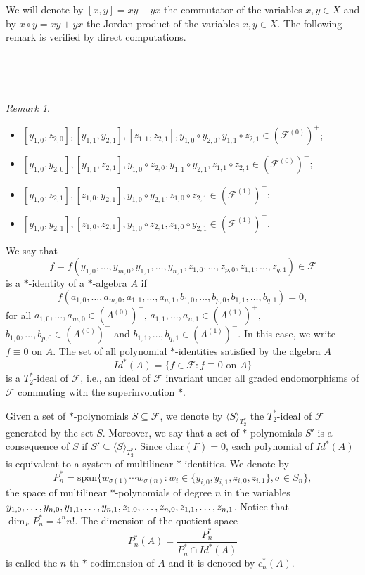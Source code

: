 \documentclass[11pt]{amsart}
\theoremstyle{definition}
\theoremstyle{remark}
\newtheorem{remark}[theorem]{Remark}
\begin{document}
	We will denote by $[x,y]=xy-yx$ the commutator of the variables $x,y\in X$ and by $x\circ y=xy+yx$ the Jordan product of the variables $x,y\in X$. The following remark is verified by direct computations.

\
    
    \

	\begin{remark}\label{consequences}
		\
		
		\begin{itemize}
			\item[1.] $[y_{1,0},z_{2,0}], [y_{1,1},y_{2,1}],[z_{1,1},z_{2,1}],y_{1,0}\circ y_{2,0},y_{1,1}\circ z_{2,1}\in (\mathcal{F}^{(0)})^+$;
			\item[2.] $[y_{1,0},y_{2,0}], [y_{1,1},z_{2,1}], y_{1,0}\circ z_{2,0}, y_{1,1}\circ y_{2,1},z_{1,1}\circ z_{2,1}\in (\mathcal{F}^{(0)})^-$;
			\item[3.] $[y_{1,0},z_{2,1}], [z_{1,0},y_{2,1}],y_{1,0}\circ y_{2,1}, z_{1,0}\circ z_{2,1}\in (\mathcal{F}^{(1)})^+$;
			\item[4.] $[y_{1,0},y_{2,1}], [z_{1,0},z_{2,1}],y_{1,0}\circ z_{2,1}, z_{1,0}\circ y_{2,1}\in (\mathcal{F}^{(1)})^-$.
		\end{itemize}
	\end{remark}
	
	We say that $$f = f(y_{1,0},  \ldots , y_{m,0}, y_{1,1},  \ldots, y_{n,1}, z_{1,0}, \ldots, z_{p,0}, z_{1,1},  \ldots, z_{q,1}) \in \mathcal{F}$$
	is a $*$-identity of a $*$-algebra $A$ if $$f(a_{1,0}, \ldots, a_{m,0},a_{1,1}, \ldots , a_{n,1}, b_{1,0}, \ldots , b_{p,0}, b_{1,1}, \ldots , b_{q,1}) = 0,$$ 
	for all $a_{1,0}, \ldots, a_{m,0} \in (A^{(0)})^{+}$, $a_{1,1}, \ldots, a_{n,1} \in (A^{(1)})^{+}$, $b_{1,0}, \ldots, b_{p,0} \in (A^{(0)})^{-}$ and $b_{1,1}, \ldots , b_{q,1} \in (A^{(1)})^{-}$. In this case, we write $f\equiv 0$ on $A$. The set of all polynomial $*$-identities satisfied by the algebra $A$ 
	$$
	Id^*(A) = \{f \in \mathcal{F}: f \equiv 0 \mbox{ on } A \}
	$$ 
	is a $T^{*}_{2}$-ideal of $\mathcal{F}$, i.e., an ideal of $\mathcal{F}$ invariant under all graded endomorphisms of $\mathcal{F}$ commuting with the superinvolution $*$.
	
	Given a set of $*$-polynomials $S \subseteq \mathcal{F}$, we denote by $\langle S \rangle_{T_2^*}$ the $T_2^*$-ideal of $\mathcal{F}$ generated by the set $S$. Moreover, we say that a set of $*$-polynomials $S'$ is a consequence of $S$ if $S' \subseteq \langle S \rangle_{T_2^*}$. Since char$(F) =0$, each polynomial of $Id^*(A)$ is
	equivalent to a system of multilinear $*$-identities. We denote by
	$$
	P_{n}^{*} = \textrm{span}\{w_{\sigma(1)} \cdots w_{\sigma(n)}: w_{i} \in \{y_{i,0},y_{i,1},z_{i,0},z_{i,1}\}, \sigma \in S_{n}\},
	$$ 
	the space of multilinear $*$-polynomials of degree $n$ in the variables $y_{1,0},  \ldots , y_{n,0}, \\ y_{1,1}, \ldots, y_{n,1}, z_{1,0}, \ldots, z_{n,0}, z_{1,1},  \ldots, z_{n,1}$. Notice that $\dim_FP_n^*=4^nn!$. The dimension of the quotient space
	$$P_n^{*}(A)=\displaystyle \frac{P_n^{*}}{P_n^{*}\cap Id^*(A)}$$ is called the $n$-th $*$-codimension of $A$ and it is denoted by  $c_n^*(A)$.
	
\end{document}
